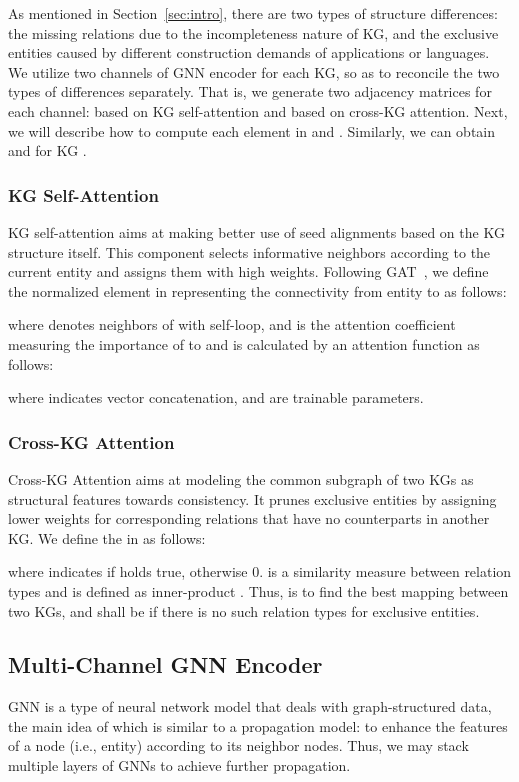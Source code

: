 \documentclass[11pt,a4paper]{article}
\begin{document}
As mentioned in Section~\ref{sec:intro}, there are two types of structure differences: the missing relations due to the incompleteness nature of KG, and the exclusive entities caused by different construction demands of applications or languages. We utilize two channels of GNN encoder for each KG, so as to reconcile the two types of differences separately. That is, we generate two adjacency matrices for each channel:  based on KG self-attention and  based on cross-KG attention. Next, we will describe how to compute each element  in  and . Similarly, we can obtain  and  for KG .

\subsubsection*{KG Self-Attention}
KG self-attention aims at making better use of seed alignments based on the KG structure itself. This component selects informative neighbors according to the current entity and assigns them with high weights. Following GAT~\cite{velivckovic2018graph}, we define the normalized element  in  representing the connectivity from entity  to  as follows:


where  denotes neighbors of  with self-loop, and  is the attention coefficient measuring the importance of  to  and is calculated by an attention function  as follows:


where  indicates vector concatenation,  and  are trainable parameters.

\subsubsection*{Cross-KG Attention}
Cross-KG Attention aims at modeling the common subgraph of two KGs as structural features towards consistency. It prunes exclusive entities by assigning lower weights for corresponding relations that have no counterparts in another KG. We define the  in  as follows:


where  indicates  if holds true, otherwise 0.  is a similarity measure between relation types and is defined as inner-product . Thus,  is to find the best mapping between two KGs, and shall be  if there is no such relation types for exclusive entities.

\subsection{Multi-Channel GNN Encoder}

GNN is a type of neural network model that deals with graph-structured data, the main idea of which is similar to a propagation model: to enhance the features of a node (i.e., entity) according to its neighbor nodes. Thus, we may stack multiple  layers of GNNs to achieve further propagation.
\end{document}
